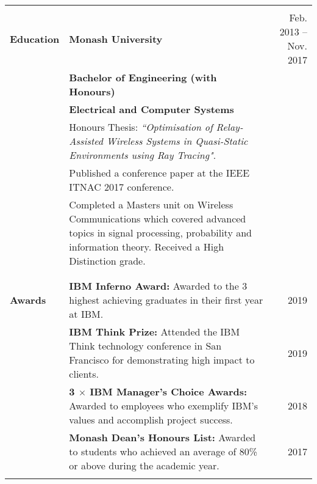 \documentclass[a4paper,10pt]{letter}
\begin{document}
\begin{tabular}{ @{} p{2.5cm} p{12cm} r }
 & & \\
\hline \\
\large
\textbf{Education} & \textbf{Monash University} & \normalsize Feb. 2013 -- Nov. 2017 \\
 & \textbf{Bachelor of Engineering (with Honours)} & \\
 & \textbf{Electrical and Computer Systems} & \\
\large
 & Honours Thesis: \textit{``Optimisation of Relay-Assisted Wireless Systems in Quasi-Static Environments using Ray Tracing"}. & \\
 & Published a conference paper at the IEEE ITNAC 2017 conference. & \\
 & Completed a Masters unit on Wireless Communications which covered advanced topics in signal processing, probability and information theory. Received a High Distinction grade. & \\
 & \\
\hline \\
\large
\textbf{Awards} & \textbf{IBM Inferno Award:} Awarded to the 3 highest achieving graduates in their first year at IBM. & \normalsize 2019 \\
 & \textbf{IBM Think Prize:} Attended the IBM Think technology conference in San Francisco for demonstrating high impact to clients. & \normalsize 2019 \\
 & \textbf{3 $\times$ IBM Manager's Choice Awards:} Awarded to employees who exemplify IBM's values and accomplish project success. & \normalsize 2018 \\
 & \textbf{Monash Dean's Honours List:} Awarded to students who achieved an average of 80\% or above during the academic year. & \normalsize 2017 \\
 & & 
\end{tabular}
\end{document}
